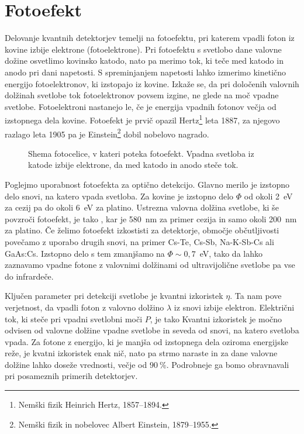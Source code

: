 \section{Fotoefekt}
Delovanje kvantnih detektorjev temelji na fotoefektu, pri katerem vpadli
foton iz kovine izbije elektrone (fotoelektrone). Pri fotoefektu s svetlobo
dane valovne dožine osvetlimo kovinsko katodo, nato pa merimo tok, ki teče med katodo
in anodo pri dani napetosti. S spreminjanjem napetosti lahko izmerimo kinetično 
energijo fotoelektronov, ki izstopajo iz kovine. Izkaže se, da pri določenih 
valovnih dolžinah svetlobe tok fotoelektronov povsem izgine, ne glede na moč vpadne svetlobe.
Fotoelektroni nastanejo le, če je energija vpadnih fotonov večja od izstopnega
dela kovine. Fotoefekt je prvič opazil Hertz\footnote{Nemški fizik Heinrich Hertz, 1857--1894.} 
leta 1887, za njegovo razlago leta
1905 pa je Einstein\footnote{Nemški fizik in nobelovec Albert Einstein, 1879--1955.} 
dobil nobelovo nagrado. 
\begin{figure}[h]
\centering
\def\svgwidth{60truemm} 

\caption{Shema fotocelice, v kateri poteka fotoefekt. 
Vpadna svetloba iz katode izbije elektrone, da med katodo in anodo steče tok.}
\label{fig:Fotoefekt}
\end{figure}

Poglejmo uporabnost fotoefekta za optično detekcijo. Glavno merilo je 
izstopno delo snovi, na katero vpada svetloba. Za kovine je izstopno delo $\Phi$
od okoli 2~eV za cezij pa do okoli 6~eV za platino. 
Ustrezna valovna dolžina svetlobe, ki še povzroči fotoefekt, je tako 
\beq
\lambda \leq {},
\eeq
kar je 580~nm za primer cezija in samo okoli 200~nm za platino. Če želimo fotoefekt
izkostisti za detektorje, območje občutljivosti povečamo z uporabo drugih snovi,
na primer Cs-Te, Cs-Sb, Na-K-Sb-Cs ali GaAs:Cs.
Izstopno delo s tem zmanjšamo na $\Phi \sim 0,7$~eV, tako da lahko zaznavamo 
vpadne fotone z valovnimi dolžinami od ultravijolične svetlobe pa vse do infrardeče. 

Ključen parameter pri detekciji svetlobe je kvantni izkoristek $\eta$.
Ta nam pove verjetnost, da vpadli foton z valovno dolžino $\lambda$ iz 
snovi izbije elektron. Električni tok, ki steče pri vpadni svetlobni moči $P$, je tako
Kvantni izkoristek je močno odvisen od valovne dolžine vpadne svetlobe in seveda
od snovi, na katero svetloba vpada. Za fotone z energijo, ki je manjša od izstopnega 
dela oziroma energijske reže, je kvatni izkoristek enak nič, nato pa strmo naraste in za
dane valovne dolžine lahko doseže vrednosti, večje od $90~\%$. Podrobneje ga bomo 
obravnavali pri posameznih primerih detektorjev.

